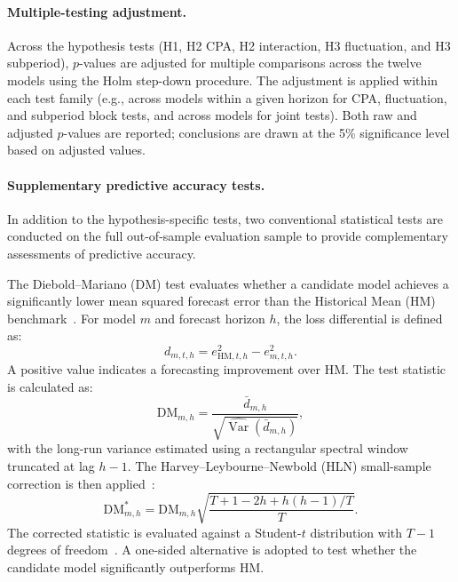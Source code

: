 \documentclass[12pt,twoside]{ord}
\begin{document}
\paragraph{Multiple-testing adjustment.} Across the hypothesis tests (H1, H2 CPA, H2 interaction, H3 fluctuation, and H3 subperiod), $p$-values are adjusted for multiple comparisons across the twelve models using the Holm step-down procedure. The adjustment is applied within each test family (e.g., across models within a given horizon for CPA, fluctuation, and subperiod block tests, and across models for joint tests). Both raw and adjusted $p$-values are reported; conclusions are drawn at the 5\% significance level based on adjusted values.

\paragraph{Supplementary predictive accuracy tests.} In addition to the hypothesis-specific tests, two conventional statistical tests are conducted on the full out-of-sample evaluation sample to provide complementary assessments of predictive accuracy.

The Diebold--Mariano (DM) test evaluates whether a candidate model achieves a significantly lower mean squared forecast error than the Historical Mean (HM) benchmark~\cite{diebold1995}. For model $m$ and forecast horizon $h$, the loss differential is defined as:
\[
d_{m,t,h}
=
e^2_{\mathrm{HM},t,h}-e^2_{m,t,h}.
\]
A positive value indicates a forecasting improvement over HM. The test statistic is calculated as:
\[
\mathrm{DM}_{m,h}
=
\frac{\bar d_{m,h}}
{\sqrt{\widehat{\operatorname{Var}}(\bar d_{m,h})}},
\]
with the long-run variance estimated using a rectangular spectral window truncated at lag $h-1$. The Harvey--Leybourne--Newbold (HLN) small-sample correction is then applied~\cite{buturac2022,diebold1995,harvey1997}:
\begin{equation}\label{eq:dm_stat}
\mathrm{DM}^{*}_{m,h}
=
\mathrm{DM}_{m,h}
\sqrt{
\frac{T+1-2h+h(h-1)/T}{T}
}.
\end{equation}
The corrected statistic is evaluated against a Student-$t$ distribution with $T-1$ degrees of freedom~\cite{buturac2022,harvey1997}. A one-sided alternative is adopted to test whether the candidate model significantly outperforms HM.
\end{document}
